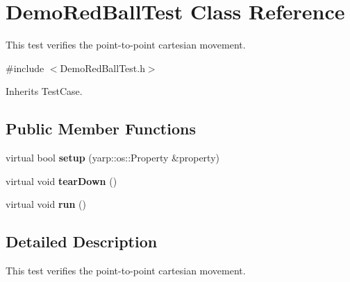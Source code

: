 \section{Demo\+Red\+Ball\+Test Class Reference}
\label{classDemoRedBallTest}


This test verifies the point-\/to-\/point cartesian movement.  




{\ttfamily \#include $<$Demo\+Red\+Ball\+Test.\+h$>$}



Inherits Test\+Case.

\subsection*{Public Member Functions}
\begin{DoxyCompactItemize}
\item 
\mbox{\label{classDemoRedBallTest_ac659a7047cc7329f932a52489c836c40}} 
virtual bool {\bfseries setup} (yarp\+::os\+::\+Property \&property)
\item 
\mbox{\label{classDemoRedBallTest_a57f96bc8718f248f25fa2aced05223db}} 
virtual void {\bfseries tear\+Down} ()
\item 
\mbox{\label{classDemoRedBallTest_a80b08218a2980e2aed26cd55066d3917}} 
virtual void {\bfseries run} ()
\end{DoxyCompactItemize}


\subsection{Detailed Description}
This test verifies the point-\/to-\/point cartesian movement. 

